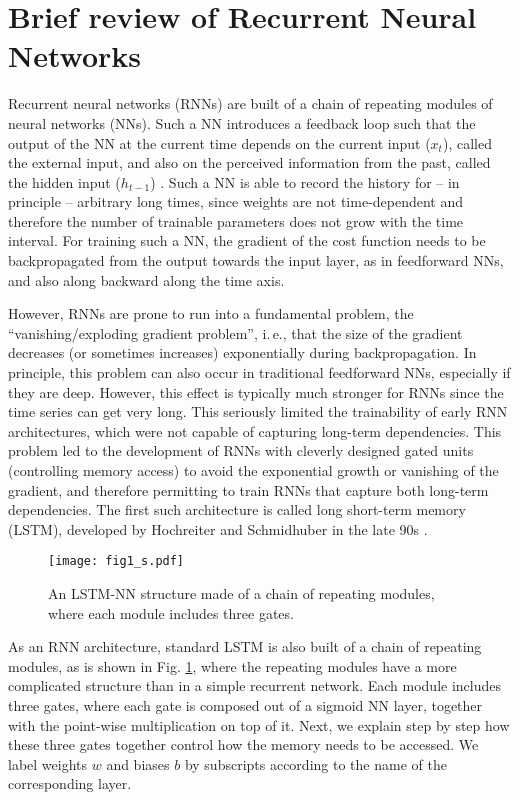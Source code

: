 \documentclass[a4paper,aps,amsmath,amssymb,twocolumn,longbibliography,,accepted=2022-05-17]{quantumarticle}
\begin{document}
\section{Brief review of Recurrent Neural Networks}



Recurrent neural networks (RNNs) are built of a chain of repeating modules of neural networks (NNs). Such a NN introduces a feedback loop such that the output of the NN at the current time depends on the current input ($x_t$), called the external input, and also on the perceived information from the past, called the hidden input ($h_{t-1}$) \cite{nielsen2015neural}. Such a NN is able to record the history for -- in principle -- arbitrary long times, since weights are not time-dependent and therefore the number of trainable parameters does not grow with the time interval. For training such a NN, the gradient of the cost function needs to be backpropagated from the output towards the input layer, as in feedforward NNs, and also along backward along the time axis.

However, RNNs are prone to run into a fundamental problem, the ``vanishing/exploding gradient problem'', i.\,e., that the size of the gradient decreases (or sometimes increases) exponentially during backpropagation. In principle, this problem can also occur in traditional feedforward NNs, especially if they are deep. However, this effect is typically much stronger for RNNs since the time series can get very long. This seriously limited the trainability of early RNN architectures, which were not capable of capturing long-term dependencies. This problem led to the development of RNNs with cleverly designed gated units (controlling memory access) to avoid the exponential growth or vanishing of the gradient, and therefore permitting to train RNNs that capture both long-term dependencies. The first such architecture is called long short-term memory (LSTM), developed by Hochreiter and Schmidhuber in the late 90s \cite{hochreiter1735long}. %
\begin{figure}{}
	\centering
	\texttt{[image: fig1\_s.pdf]}
	\caption{An LSTM-NN structure made of a chain of repeating modules, where each module includes three gates.}
	\label{figs1}
\end{figure}
As an RNN architecture, standard LSTM is also built of a chain of repeating modules, as is shown in Fig. \ref{figs1}, where the repeating modules have a more complicated structure than in a simple recurrent  network. Each module includes three gates, where each gate is composed out of a sigmoid NN layer, together with the point-wise multiplication on top of it. Next, we explain step by step how these three gates together control how the memory needs to be accessed. We label weights $w$ and biases $b$ by subscripts according to the name of the corresponding layer.
\end{document}
